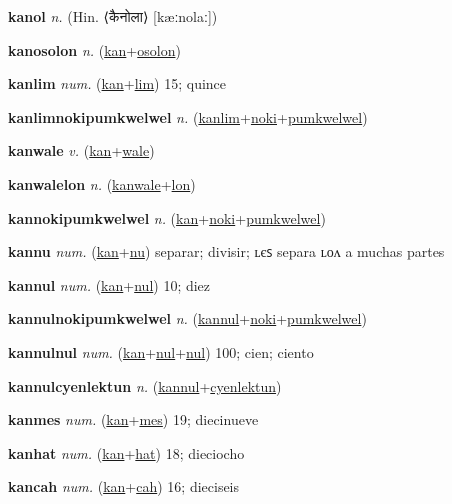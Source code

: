 \textbf{\hypertarget{kanol}{kanol}} \textit{n.} (Hin. ⟨{\devanagari{}कैनोला}⟩ [kæːnolaː])


\textbf{\hypertarget{kanosolon}{kanosolon}} \textit{n.} (\hyperlink{kan}{kan}+\allowbreak \hyperlink{osolon}{osolon})


\textbf{\hypertarget{kanlim}{kanlim}} \textit{num.} (\hyperlink{kan}{kan}+\allowbreak \hyperlink{lim}{lim})
15; quince

\textbf{\hypertarget{kanlimnokipumkwelwel}{kanlimnokipumkwelwel}} \textit{n.} (\hyperlink{kanlim}{kanlim}+\allowbreak \hyperlink{noki}{noki}+\allowbreak \hyperlink{pumkwelwel}{pumkwelwel})


\textbf{\hypertarget{kanwale}{kanwale}} \textit{v.} (\hyperlink{kan}{kan}+\allowbreak \hyperlink{wale}{wale})


\textbf{\hypertarget{kanwalelon}{kanwalelon}} \textit{n.} (\hyperlink{kanwale}{kanwale}+\allowbreak \hyperlink{lon}{lon})


\textbf{\hypertarget{kannokipumkwelwel}{kannokipumkwelwel}} \textit{n.} (\hyperlink{kan}{kan}+\allowbreak \hyperlink{noki}{noki}+\allowbreak \hyperlink{pumkwelwel}{pumkwelwel})


\textbf{\hypertarget{kannu}{kannu}} \textit{num.} (\hyperlink{kan}{kan}+\allowbreak \hyperlink{nu}{nu})
separar; divisir; ʟєꜱ separa ʟᴏᴧ a muchas partes

\textbf{\hypertarget{kannul}{kannul}} \textit{num.} (\hyperlink{kan}{kan}+\allowbreak \hyperlink{nul}{nul})
10; diez

\textbf{\hypertarget{kannulnokipumkwelwel}{kannulnokipumkwelwel}} \textit{n.} (\hyperlink{kannul}{kannul}+\allowbreak \hyperlink{noki}{noki}+\allowbreak \hyperlink{pumkwelwel}{pumkwelwel})


\textbf{\hypertarget{kannulnul}{kannulnul}} \textit{num.} (\hyperlink{kan}{kan}+\allowbreak \hyperlink{nul}{nul}+\allowbreak \hyperlink{nul}{nul})
100; cien; ciento

\textbf{\hypertarget{kannulcyenlektun}{kannulcyenlektun}} \textit{n.} (\hyperlink{kannul}{kannul}+\allowbreak \hyperlink{cyenlektun}{cyenlektun})


\textbf{\hypertarget{kanmes}{kanmes}} \textit{num.} (\hyperlink{kan}{kan}+\allowbreak \hyperlink{mes}{mes})
19; diecinueve

\textbf{\hypertarget{kanhat}{kanhat}} \textit{num.} (\hyperlink{kan}{kan}+\allowbreak \hyperlink{hat}{hat})
18; dieciocho

\textbf{\hypertarget{kancah}{kancah}} \textit{num.} (\hyperlink{kan}{kan}+\allowbreak \hyperlink{cah}{cah})
16; dieciseis

